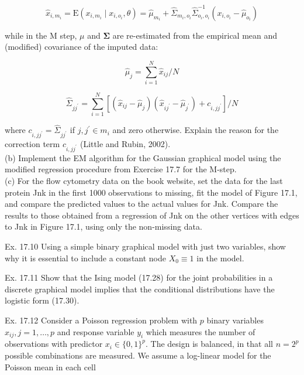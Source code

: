\documentclass[10pt]{article}
\begin{document}
\begin{equation*}
\hat{x}_{i, m_{i}}=\mathrm{E}\left(x_{i, m_{i}} \mid x_{i, o_{i}}, \theta\right)=\hat{\mu}_{m_{i}}+\hat{\Sigma}_{m_{i}, o_{i}} \hat{\Sigma}_{o_{i}, o_{i}}^{-1}\left(x_{i, o_{i}}-\hat{\mu}_{o_{i}}\right) \tag{17.43}
\end{equation*}


while in the M step, $\mu$ and $\boldsymbol{\Sigma}$ are re-estimated from the empirical mean and (modified) covariance of the imputed data:

$$
\hat{\mu}_{j}=\sum_{i=1}^{N} \hat{x}_{i j} / N
$$


\begin{equation*}
\hat{\Sigma}_{j j^{\prime}}=\sum_{i=1}^{N}\left[\left(\hat{x}_{i j}-\hat{\mu}_{j}\right)\left(\hat{x}_{i j^{\prime}}-\hat{\mu}_{j^{\prime}}\right)+c_{i, j j^{\prime}}\right] / N \tag{17.44}
\end{equation*}


where $c_{i, j j^{\prime}}=\hat{\Sigma}_{j j^{\prime}}$ if $j, j^{\prime} \in m_{i}$ and zero otherwise. Explain the reason for the correction term $c_{i, j j^{\prime}}$ (Little and Rubin, 2002).\\
(b) Implement the EM algorithm for the Gaussian graphical model using the modified regression procedure from Exercise 17.7 for the M-step.\\
(c) For the flow cytometry data on the book website, set the data for the last protein Jnk in the first 1000 observations to missing, fit the model of Figure 17.1, and compare the predicted values to the actual values for Jnk. Compare the results to those obtained from a regression of Jnk on the other vertices with edges to Jnk in Figure 17.1, using only the non-missing data.

Ex. 17.10 Using a simple binary graphical model with just two variables, show why it is essential to include a constant node $X_{0} \equiv 1$ in the model.

Ex. 17.11 Show that the Ising model (17.28) for the joint probabilities in a discrete graphical model implies that the conditional distributions have the logistic form (17.30).

Ex. 17.12 Consider a Poisson regression problem with $p$ binary variables $x_{i j}, j=1, \ldots, p$ and response variable $y_{i}$ which measures the number of observations with predictor $x_{i} \in\{0,1\}^{p}$. The design is balanced, in that all $n=2^{p}$ possible combinations are measured. We assume a log-linear model for the Poisson mean in each cell
\end{document}
